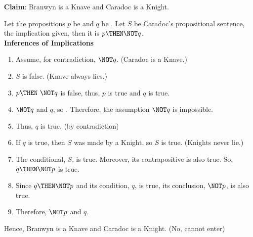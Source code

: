 \begin{enumerate}
\begin{enumerate}
  {\color{redcolor}\textbf{Claim}: Branwyn is a Knave and Caradoc is a Knight.}
  \begin{subprove}
    Let the propositions \(p\) be  and 
    \(q\) be . Let \(S\) be Caradoc's propositional
    sentence, the implication given, then it is \(p \THEN \NOT q\).\\
    \textbf{Inferences of Implications}
    \begin{enumerate}
      \item Assume, for contradiction, \(\NOT q\). (Caradoc is a Knave.)
      \item \(S\) is false. (Knave always lies.)
      \item \(p \THEN ~\NOT q\) is false, thus, \(p\) is true and \(q\) is true.
      \item \(\NOT q\) and \(q\), so \FALSE. Therefore, the assumption \(\NOT q\) is impossible.
      \item Thus, \(q\) is true. (by contradiction)
      \item If \(q\) is true, then \(S\) was made by a Knight, so \(S\) is true. (Knights never lie.)
      \item The conditional, \(S\), is true. Moreover, its contrapositive is also true. So, \(q \THEN \NOT p\) is true.
      \item Since \(q \THEN \NOT p\) and its condition, $q$, is true, its conclusion, \(\NOT p\), is also true.
      \item Therefore, \(\NOT p\) and \(q\).
    \end{enumerate}
    Hence, Branwyn is a Knave and Caradoc is a Knight. (No, cannot enter)
  \end{subprove}
  \end{enumerate}
\end{enumerate}